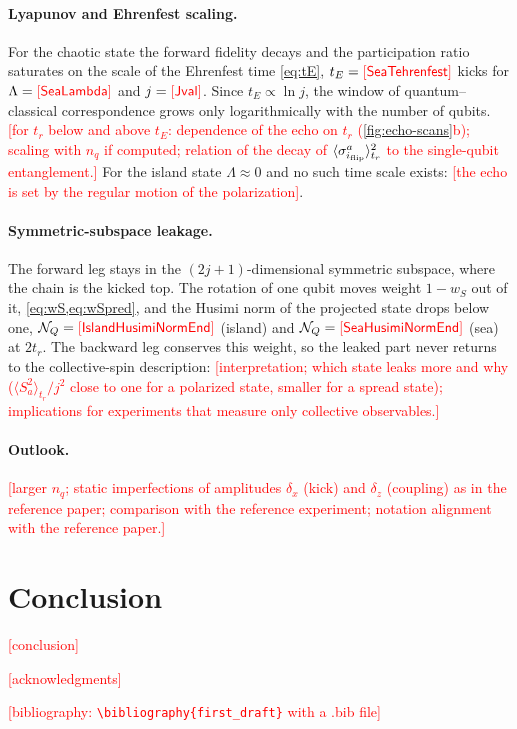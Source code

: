 \documentclass[aps,pra,twocolumn,superscriptaddress,nofootinbib]{revtex4-2}
\newcommand{\PH}[1]{\textcolor{red}{[\textsf{#1}]}}
\newcommand{\num}[1]{\ifcsname Num#1\endcsname\csname Num#1\endcsname\else\PH{#1}\fi}
\newcommand{\nq}{n_q}                      %
\newcommand{\tr}{t_r}                      %
\newcommand{\tE}{t_E}                      %
\newcommand{\iflip}{i_{\rm flip}}          %
\newcommand{\wS}{w_S}                      %
\newcommand{\NQ}{\mathcal N_Q}             %
\begin{document}
\paragraph{Lyapunov and Ehrenfest scaling.}
For the chaotic state the forward fidelity decays and the participation ratio saturates on the scale of the Ehrenfest
time \cref{eq:tE}, $\tE=\num{SeaTehrenfest}$ kicks for $\Lambda=\num{SeaLambda}$ and $j=\num{Jval}$. Since
$\tE\propto\ln j$, the window of quantum--classical correspondence grows only logarithmically with the number of qubits.
\PH{for $\tr$ below and above $\tE$: dependence of the echo on $\tr$ (\cref{fig:echo-scans}b); scaling with $\nq$ if
computed; relation of the decay of $\langle\sigma^a_{\iflip}\rangle_{\tr}^2$ to the single-qubit entanglement.} For the
island state $\Lambda\approx0$ and no such time scale exists: \PH{the echo is set by the regular motion of the
polarization}.

\paragraph{Symmetric-subspace leakage.}
The forward leg stays in the $(2j+1)$-dimensional symmetric subspace, where the chain is the kicked top. The rotation of
one qubit moves weight $1-\wS$ out of it, \cref{eq:wS,eq:wSpred}, and the Husimi norm of the projected state drops
below one, $\NQ=\num{IslandHusimiNormEnd}$ (island) and $\NQ=\num{SeaHusimiNormEnd}$ (sea) at $2\tr$. The backward
leg conserves this weight, so the leaked part never returns to the collective-spin description: \PH{interpretation;
which state leaks more and why ($\langle S_a^2\rangle_{\tr}/j^2$ close to one for a polarized state, smaller for a
spread state); implications for experiments that measure only collective observables.}

\paragraph{Outlook.}
\PH{larger $\nq$; static imperfections of amplitudes $\delta_x$ (kick) and $\delta_z$ (coupling) as in the reference paper; comparison
with the reference experiment; notation alignment with the reference paper.}

\section{Conclusion}\label{sec:conclusion}

\PH{conclusion}

\begin{acknowledgments}
\PH{acknowledgments}
\end{acknowledgments}

\PH{bibliography: \texttt{\textbackslash bibliography\{first\_draft\}} with a .bib file}
\end{document}
